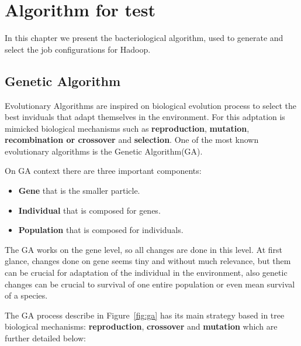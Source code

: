 \chapter{Algorithm for test}
\label{cha:bacAlg}

In this chapter we present the bacteriological algorithm, used to generate and
select the job configurations for Hadoop. 

\section{Genetic Algorithm}
\label{subsec:evolutionay_algorithms}
Evolutionary Algorithms are inspired on biological evolution process to select
the best inviduals that adapt themselves in the environment. For this adptation
is mimicked biological mechanisms such as \textbf{reproduction}, \textbf{mutation},
\textbf{recombination or crossover} and \textbf{selection}. One of the most known
evolutionary algorithms is the Genetic Algorithm(GA).

On GA context there are three important components:
\begin{itemize}
    \item \textbf{Gene} that is the smaller particle.
    \item \textbf{Individual} that is composed for genes.
    \item \textbf{Population} that is composed for individuals.
\end{itemize}

The GA works on the gene level, so all changes are done in this level. At first
glance, changes done on gene seems tiny and without much relevance, but them can
be crucial for adaptation of the individual in the environment, also genetic
changes can be crucial to survival of one entire population or even mean survival
of a species.


The GA process describe in Figure~\ref{fig:ga} has its main strategy
based in tree biological mechanisms: \textbf{reproduction}, \textbf{crossover}
and \textbf{mutation} which are further detailed below:

